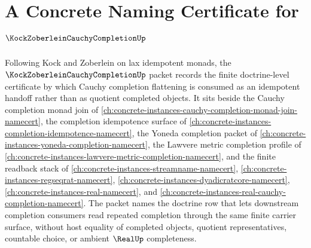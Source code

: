 \chapter{A Concrete Naming Certificate for $\KockZoberleinCauchyCompletionUp$}
\label{ch:concrete-instances-kock-zoberlein-cauchy-completion-namecert}

Following Kock and Zoberlein on lax idempotent monads, the $\KockZoberleinCauchyCompletionUp$ packet records the finite doctrine-level certificate by which Cauchy completion flattening is consumed as an idempotent handoff rather than as quotient completed objects. It sits beside the Cauchy completion monad join of \autoref{ch:concrete-instances-cauchy-completion-monad-join-namecert}, the completion idempotence surface of \autoref{ch:concrete-instances-completion-idempotence-namecert}, the Yoneda completion packet of \autoref{ch:concrete-instances-yoneda-completion-namecert}, the Lawvere metric completion profile of \autoref{ch:concrete-instances-lawvere-metric-completion-namecert}, and the finite readback stack of \autoref{ch:concrete-instances-streamname-namecert}, \autoref{ch:concrete-instances-regseqrat-namecert}, \autoref{ch:concrete-instances-dyadicratcore-namecert}, \autoref{ch:concrete-instances-real-namecert}, and \autoref{ch:concrete-instances-real-cauchy-completion-namecert}. The packet names the doctrine row that lets downstream completion consumers read repeated completion through the same finite carrier surface, without host equality of completed objects, quotient representatives, countable choice, or ambient $\RealUp$ completeness.

